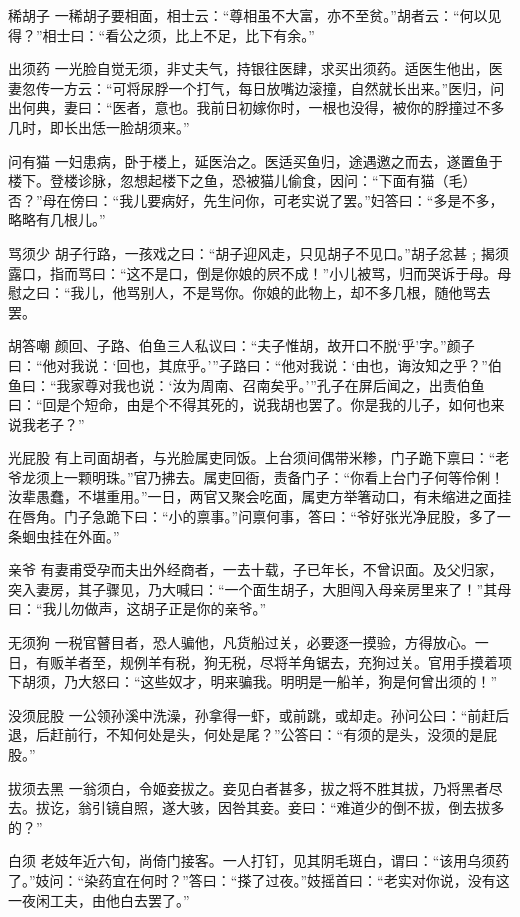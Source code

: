 \documentclass[12pt,UTF8]{ctexbook}
\begin{document}
稀胡子
一稀胡子要相面，相士云：“尊相虽不大富，亦不至贫。”胡者云：“何以见得？”相士曰：“看公之须，比上不足，比下有余。”

出须药
一光脸自觉无须，非丈夫气，持银往医肆，求买出须药。适医生他出，医妻忽传一方云：“可将尿脬一个打气，每日放嘴边滚撞，自然就长出来。”医归，问出何典，妻曰：“医者，意也。我前日初嫁你时，一根也没得，被你的脬撞过不多几时，即长出恁一脸胡须来。”

问有猫
一妇患病，卧于楼上，延医治之。医适买鱼归，途遇邀之而去，遂置鱼于楼下。登楼诊脉，忽想起楼下之鱼，恐被猫儿偷食，因问：“下面有猫（毛）否？”母在傍曰：“我儿要病好，先生问你，可老实说了罢。”妇答曰：“多是不多，略略有几根儿。”

骂须少
胡子行路，一孩戏之曰：“胡子迎风走，只见胡子不见口。”胡子忿甚﹔揭须露口，指而骂曰：“这不是口，倒是你娘的屄不成！”小儿被骂，归而哭诉于母。母慰之曰：“我儿，他骂别人，不是骂你。你娘的此物上，却不多几根，随他骂去罢。

胡答嘲
颜回、子路、伯鱼三人私议曰：“夫子惟胡，故开口不脱‘乎’字。”颜子曰：“他对我说：‘回也，其庶乎。’”子路曰：“他对我说：‘由也，诲汝知之乎？”伯鱼曰：“我家尊对我也说：‘汝为周南、召南矣乎。’”孔子在屏后闻之，出责伯鱼曰：“回是个短命，由是个不得其死的，说我胡也罢了。你是我的儿子，如何也来说我老子？”

光屁股
有上司面胡者，与光脸属吏同饭。上台须间偶带米糁，门子跪下禀曰：“老爷龙须上一颗明珠。”官乃拂去。属吏回衙，责备门子：“你看上台门子何等伶俐！汝辈愚蠢，不堪重用。”一日，两官又聚会吃面，属吏方举箸动口，有未缩进之面挂在唇角。门子急跪下曰：“小的禀事。”问禀何事，答曰：“爷好张光净屁股，多了一条蛔虫挂在外面。”

亲爷
有妻甫受孕而夫出外经商者，一去十载，子已年长，不曾识面。及父归家，突入妻房，其子骤见，乃大喊曰：“一个面生胡子，大胆闯入母亲房里来了！”其母曰：“我儿勿做声，这胡子正是你的亲爷。”

无须狗
一税官瞽目者，恐人骗他，凡货船过关，必要逐一摸验，方得放心。一日，有贩羊者至，规例羊有税，狗无税，尽将羊角锯去，充狗过关。官用手摸着项下胡须，乃大怒曰：“这些奴才，明来骗我。明明是一船羊，狗是何曾出须的！”

没须屁股
一公领孙溪中洗澡，孙拿得一虾，或前跳，或却走。孙问公曰：“前赶后退，后赶前行，不知何处是头，何处是尾？”公答曰：“有须的是头，没须的是屁股。”

拔须去黑
一翁须白，令姬妾拔之。妾见白者甚多，拔之将不胜其拔，乃将黑者尽去。拔讫，翁引镜自照，遂大骇，因咎其妾。妾曰：“难道少的倒不拔，倒去拔多的？”

白须
老妓年近六旬，尚倚门接客。一人打钉，见其阴毛斑白，谓曰：“该用乌须药了。”妓问：“染药宜在何时？”答曰：“搽了过夜。”妓摇首曰：“老实对你说，没有这一夜闲工夫，由他白去罢了。”
\end{document}
